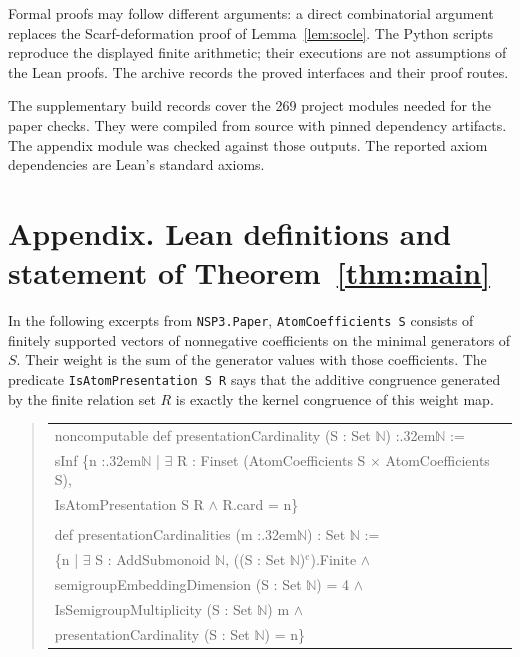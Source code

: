 \documentclass[11pt]{article}
\theoremstyle{definition}
\theoremstyle{remark}
\theoremstyle{plain}
\begin{document}
Formal proofs may follow different arguments: a direct combinatorial
argument replaces the Scarf-deformation proof of Lemma~\ref{lem:socle}.
The Python scripts reproduce the displayed finite arithmetic; their
executions are not assumptions of the Lean proofs. The archive records
the proved interfaces and their proof routes.

The supplementary build records cover the 269 project modules needed
for the paper checks. They were compiled from source with pinned dependency
artifacts. The appendix module was checked against those outputs.
The reported axiom dependencies are Lean's standard axioms.

\section*{Appendix. Lean definitions and statement of Theorem~\ref{thm:main}}
In the following excerpts from \texttt{NSP3.Paper},
\texttt{AtomCoefficients S} consists of finitely supported vectors of
nonnegative coefficients on the minimal generators of $S$.
Their weight is the sum of the generator values with those coefficients.
The predicate \texttt{IsAtomPresentation S R} says that the additive
congruence generated by the finite relation set $R$ is exactly the
kernel congruence of this weight map.

\begin{quote}\small\ttfamily
\begin{tabular}{@{}l@{}}
\hspace*{0em}noncomputable def presentationCardinality (S : Set \(\mathbb N\)) :\kern.32em\(\mathbb N\) :=\\
\hspace*{1em}sInf \{n :\kern.32em\(\mathbb N\) | \(\exists\) R : Finset (AtomCoefficients S \(\times\) AtomCoefficients S),\\
\hspace*{2em}IsAtomPresentation S R \(\land\) R.card = n\}\\
\strut\\
\hspace*{0em}def presentationCardinalities (m :\kern.32em\(\mathbb N\)) : Set \(\mathbb N\) :=\\
\hspace*{1em}\{n | \(\exists\) S : AddSubmonoid \(\mathbb N\), ((S : Set \(\mathbb N\))\({}^{\mathrm c}\)).Finite \(\land\)\\
\hspace*{2em}semigroupEmbeddingDimension (S : Set \(\mathbb N\)) = 4 \(\land\)\\
\hspace*{2em}IsSemigroupMultiplicity (S : Set \(\mathbb N\)) m \(\land\)\\
\hspace*{2em}presentationCardinality (S : Set \(\mathbb N\)) = n\}
\end{tabular}
\end{quote}
\end{document}
